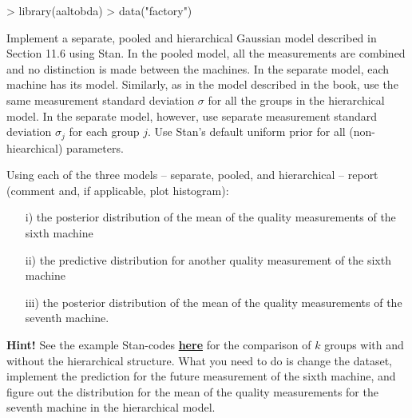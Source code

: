 \documentclass[a4paper,11pt]{article}
\begin{document}
\begin{Schunk}
\begin{Sinput}
> library(aaltobda)
> data("factory")
\end{Sinput}
\end{Schunk}

Implement a separate, pooled and hierarchical Gaussian model described in Section 11.6 using Stan. In the pooled model, all the measurements are combined and no distinction is made between the machines. In the separate model, each machine has its model. Similarly, as in the model described in the book, use the same measurement standard deviation $\sigma$ for all the groups in the hierarchical model. In the separate model, however, use separate measurement standard deviation $\sigma_j$ for each group $j$. Use Stan's default uniform prior for all (non-hiearchical) parameters.


Using each of the three models -- separate, pooled, and hierarchical -- report (comment and, if applicable, plot histogram):
\begin{itemize}
    \item [i)] the posterior distribution of the mean of the quality measurements of the sixth machine
    \item [ii)] the predictive distribution for another quality measurement of the sixth machine
    \item [iii)] the posterior distribution of the mean of the quality measurements of the seventh machine.
\end{itemize}


\textbf{Hint!} See the example Stan-codes \href{http://avehtari.github.io/BDA_R_demos/demos_rstan/rstan_demo.html#8_comparison_of_k_groups_with_hierarchical_models}{\textbf{here}} for the comparison of $k$ groups with and without the hierarchical structure. What you need to do is change the dataset, implement the prediction for the future measurement of the sixth machine, and figure out the distribution for the mean of the quality measurements for the seventh machine in the hierarchical model.
\end{document}
